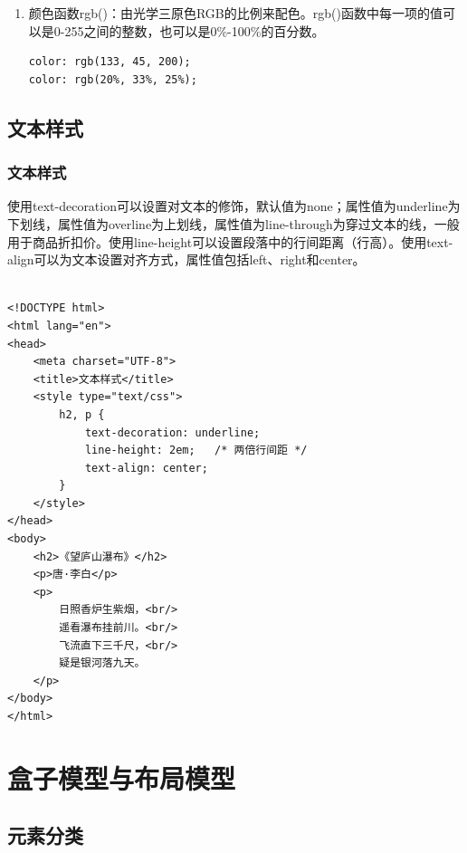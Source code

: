 \begin{enumerate}
	\item 颜色函数rgb()：由光学三原色RGB的比例来配色。rgb()函数中每一项的值可以是0-255之间的整数，也可以是0\%-100\%的百分数。 \\
	      \begin{lstlisting}[style=htmlcssjs]
color: rgb(133, 45, 200);
color: rgb(20%, 33%, 25%);
    \end{lstlisting}
\end{enumerate}

\newpage

\section{文本样式}

\subsection{文本样式}

使用text-decoration可以设置对文本的修饰，默认值为none；属性值为underline为下划线，属性值为overline为上划线，属性值为line-through为穿过文本的线，一般用于商品折扣价。使用line-height可以设置段落中的行间距离（行高）。使用text-align可以为文本设置对齐方式，属性值包括left、right和center。 \\

 \\

\begin{lstlisting}[style=htmlcssjs]
<!DOCTYPE html>
<html lang="en">
<head>
    <meta charset="UTF-8">
    <title>文本样式</title>
    <style type="text/css">
        h2, p {
            text-decoration: underline;
            line-height: 2em;   /* 两倍行间距 */
            text-align: center;
        }
    </style>
</head>
<body>
    <h2>《望庐山瀑布》</h2>
    <p>唐·李白</p>
    <p>
        日照香炉生紫烟，<br/>
        遥看瀑布挂前川。<br/>
        飞流直下三千尺，<br/>
        疑是银河落九天。
    </p>
</body>
</html>
\end{lstlisting}

\newpage

\chapter{盒子模型与布局模型}

\section{元素分类}

